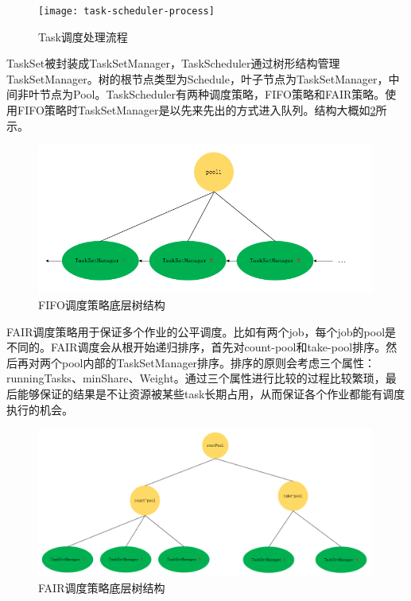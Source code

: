 \begin{figure}[htbp]
    \centering
    \texttt{[image: task-scheduler-process]}
    \caption{Task调度处理流程}
    \label{fig:task-scheduler-process}
\end{figure}

TaskSet被封装成TaskSetManager，TaskScheduler通过树形结构管理TaskSetManager。树的根节点类型为Schedule，叶子节点为TaskSetManager，中间非叶节点为Pool。TaskScheduler有两种调度策略，FIFO策略和FAIR策略。使用FIFO策略时TaskSetManager是以先来先出的方式进入队列。结构大概如\ref{fig:scheduler-fifo-tree}所示。

\begin{figure}[htbp]
    \centering
    \includegraphics[width=0.99\textwidth]{Img/spark-scheduler-fifo-tree.png}
    \caption{FIFO调度策略底层树结构}
    \label{fig:scheduler-fifo-tree}
\end{figure}

FAIR调度策略用于保证多个作业的公平调度。比如有两个job，每个job的pool是不同的。FAIR调度会从根开始递归排序，首先对count-pool和take-pool排序。然后再对两个pool内部的TaskSetManager排序。排序的原则会考虑三个属性：runningTasks、minShare、Weight。通过三个属性进行比较的过程比较繁琐，最后能够保证的结果是不让资源被某些task长期占用，从而保证各个作业都能有调度执行的机会。

\begin{figure}[htbp]
    \centering
    \includegraphics[width=0.99\textwidth]{Img/scheduler-fair-tree.png}
    \caption{FAIR调度策略底层树结构}
    \label{fig:scheduler-fair-tree}
\end{figure}


